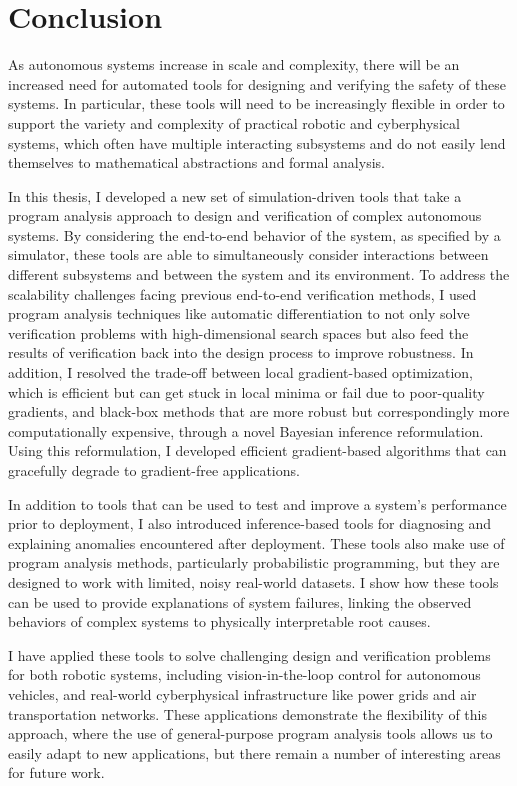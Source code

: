 \chapter{Conclusion}\label{section:conclusion}

As autonomous systems increase in scale and complexity, there will be an increased need for automated tools for designing and verifying the safety of these systems. In particular, these tools will need to be increasingly flexible in order to support the variety and complexity of practical robotic and cyberphysical systems, which often have multiple interacting subsystems and do not easily lend themselves to mathematical abstractions and formal analysis.

In this thesis, I developed a new set of simulation-driven tools that take a program analysis approach to design and verification of complex autonomous systems. By considering the end-to-end behavior of the system, as specified by a simulator, these tools are able to simultaneously consider interactions between different subsystems and between the system and its environment. To address the scalability challenges facing previous end-to-end verification methods, I used program analysis techniques like automatic differentiation to not only solve verification problems with high-dimensional search spaces but also feed the results of verification back into the design process to improve robustness. In addition, I resolved the trade-off between local gradient-based optimization, which is efficient but can get stuck in local minima or fail due to poor-quality gradients, and black-box methods that are more robust but correspondingly more computationally expensive, through a novel Bayesian inference reformulation. Using this reformulation, I developed efficient gradient-based algorithms that can gracefully degrade to gradient-free applications.

In addition to tools that can be used to test and improve a system's performance prior to deployment, I also introduced inference-based tools for diagnosing and explaining anomalies encountered after deployment. These tools also make use of program analysis methods, particularly probabilistic programming, but they are designed to work with limited, noisy real-world datasets. I show how these tools can be used to provide explanations of system failures, linking the observed behaviors of complex systems to physically interpretable root causes.

I have applied these tools to solve challenging design and verification problems for both robotic systems, including vision-in-the-loop control for autonomous vehicles, and real-world cyberphysical infrastructure like power grids and air transportation networks. These applications demonstrate the flexibility of this approach, where the use of general-purpose program analysis tools allows us to easily adapt to new applications, but there remain a number of interesting areas for future work.

